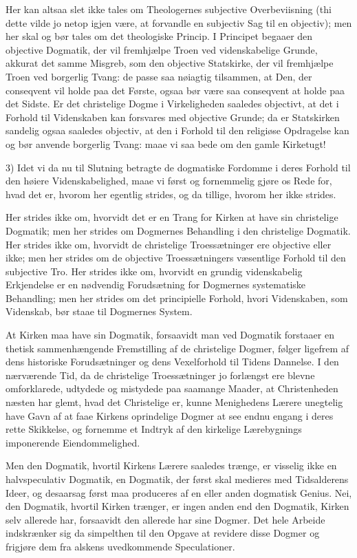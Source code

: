 \documentclass[12pt,a4paper]{book}
\newcommand{\opage}[1]{\marginnote{\footnotesize\textit{[#1]}}}
\begin{document}
Her kan altsaa slet ikke tales om Theologernes subjective Overbeviisning (thi
dette vilde jo netop igjen være, at forvandle en subjectiv Sag til en
objectiv); men her skal og bør tales om det theologiske Princip. I Principet
begaaer den objective Dogmatik, der vil fremhjælpe Troen ved videnskabelige
Grunde, akkurat det samme Misgreb, som den objective Statskirke, der vil
fremhjælpe Troen ved borgerlig Tvang: de passe saa nøiagtig tilsammen, at Den,
der conseqvent vil holde paa det Første, ogsaa bør være saa conseqvent at holde
paa det Sidste. Er det christelige Dogme i Virkeligheden saaledes objectivt, at
det i Forhold til Videnskaben kan forsvares med objective Grunde; da er
\opage{121} Statskirken sandelig ogsaa saaledes objectiv, at den i Forhold til den religiøse
Opdragelse kan og bør anvende borgerlig Tvang: maae vi saa bede om den gamle
Kirketugt!

3) Idet vi da nu til Slutning betragte de dogmatiske Fordomme i deres Forhold
til den høiere Videnskabelighed, maae vi først og fornemmelig gjøre os Rede
for, hvad det er, hvorom her egentlig strides, og da tillige, hvorom her ikke
strides.

Her strides ikke om, hvorvidt det er en Trang for Kirken at have sin
christelige Dogmatik; men her strides om Dogmernes Behandling i den christelige
Dogmatik. Her strides ikke om, hvorvidt de christelige Troessætninger ere
objective eller ikke; men her strides om de objective Troessætningers
væsentlige Forhold til den subjective Tro. Her strides ikke om, hvorvidt en
grundig videnskabelig Erkjendelse er en nødvendig Forudsætning for Dogmernes
systematiske Behandling; men her strides om det principielle Forhold, hvori
Videnskaben, som Videnskab, bør staae til Dogmernes System.

At Kirken maa have sin Dogmatik, forsaavidt man ved Dogmatik forstaaer en
thetisk sammenhængende Fremstilling af de christelige Dogmer, følger ligefrem
af dens historiske Forudsætninger og dens Vexelforhold til Tidens Dannelse. I
den nærværende Tid, da de christelige Troessætninger jo forlængst ere blevne
omforklarede, udtydede og mistydede paa saamange Maader, at Christenheden
næsten har glemt, hvad det Christelige er, kunne Menighedens Lærere unegtelig
have Gavn af at faae Kirkens oprindelige Dogmer at see endnu engang i deres
rette Skikkelse, og fornemme et Indtryk af den kirkelige Lærebygnings
imponerende Eiendommelighed.

Men den Dogmatik, hvortil Kirkens Lærere saaledes trænge, er visselig ikke en
halvspeculativ Dogmatik, en Dogmatik, der først skal medieres med Tidsalderens
Ideer, og desaarsag først maa produceres af en eller anden dogmatisk Genius.
Nei, den
\opage{122} Dogmatik, hvortil Kirken trænger, er ingen anden end den Dogmatik, Kirken selv
allerede har, forsaavidt den allerede har sine Dogmer. Det hele Arbeide
indskrænker sig da simpelthen til den Opgave at revidere disse Dogmer og
frigjøre dem fra alskens uvedkommende Speculationer.
\end{document}
